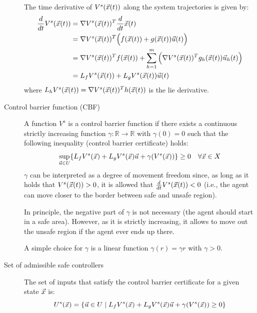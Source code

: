 \begin{description}
        \begin{remark}
            The time derivative of $V^s({\vec{x}}(t))$ along the system trajectories is given by:
            \[
                \begin{split}
                    \frac{d}{dt} V^s({\vec{x}}(t)) 
                    &= \nabla V^s({\vec{x}}(t))^T \frac{d}{dt} {\vec{x}}(t) \\
                    &= \nabla V^s({\vec{x}}(t))^T \Big( f({\vec{x}}(t)) + g({\vec{x}}(t)) {\vec{u}}(t) \Big) \\
                    &= \nabla V^s({\vec{x}}(t))^T f({\vec{x}}(t)) + \sum_{h=1}^{m} \Big( \nabla V^s({\vec{x}}(t))^T g_h({\vec{x}}(t)) {\vec{u}}_h(t) \Big)\\
                    &= L_f V^s({\vec{x}}(t)) + L_g V^s({\vec{x}}(t)) {\vec{u}}(t) \\
                \end{split}
            \]
            where $L_h V^s({\vec{x}}(t)) = \nabla V^s({\vec{x}}(t))^T h({\vec{x}}(t))$ is the lie derivative.
        \end{remark}

    \item[Control barrier function (CBF)] 
        A function $V^s$ is a control barrier function if there exists a continuous strictly increasing function $\gamma: \mathbb{R} \rightarrow \mathbb{R}$ with $\gamma(0) = 0$ such that the following inequality (control barrier certificate) holds:
        \[
            \sup_{{\vec{u}} \in U} \{ L_fV^s({\vec{x}}) + L_gV^s({\vec{x}}){\vec{u}} + \gamma(V^s({\vec{x}})) \} \geq 0 \quad \forall {\vec{x}} \in X
        \]
        $\gamma$ can be interpreted as a degree of movement freedom since, as long as it holds that $V^s({\vec{x}}(t)) > 0$, it is allowed that $\frac{d}{dt} V^s({\vec{x}}(t)) < 0$ (i.e., the agent can move closer to the border between safe and unsafe region).

        \begin{remark}
            In principle, the negative part of $\gamma$ is not necessary (the agent should start in a safe area). However, as it is strictly increasing, it allows to move out the unsafe region if the agent ever ends up there.
        \end{remark}

        \begin{example}
            A simple choice for $\gamma$ is a linear function $\gamma(r) = \gamma r$ with $\gamma > 0$.
        \end{example}

    \item[Set of admissible safe controllers] 
        The set of inputs that satisfy the control barrier certificate for a given state ${\vec{x}}$ is:
        \[
            U^s({\vec{x}}) = \{ {\vec{u}} \in U \mid L_f V^s({\vec{x}}) + L_g V^s({\vec{x}}) {\vec{u}} + \gamma(V^s({\vec{x}})) \geq 0 \}
        \]
\end{description}


